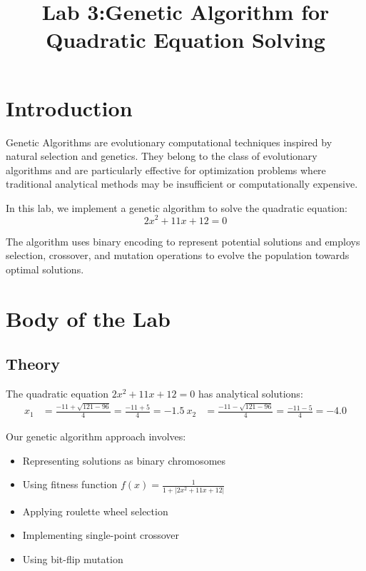 \documentclass[11pt,a4paper]{article}
\title{Lab 3:Genetic Algorithm for Quadratic Equation Solving}
\date{}
\begin{document}
\maketitle

\section{Introduction}

Genetic Algorithms are evolutionary computational techniques inspired by natural selection and genetics. They belong to the class of evolutionary algorithms and are particularly effective for optimization problems where traditional analytical methods may be insufficient or computationally expensive.

In this lab, we implement a genetic algorithm to solve the quadratic equation:
\begin{equation}
2x^2 + 11x + 12 = 0
\end{equation}

The algorithm uses binary encoding to represent potential solutions and employs selection, crossover, and mutation operations to evolve the population towards optimal solutions.

\section{Body of the Lab}

\subsection{Theory}

The quadratic equation $2x^2 + 11x + 12 = 0$ has analytical solutions:
\begin{align}
x_1 &= \frac{-11 + \sqrt{121 - 96}}{4} = \frac{-11 + 5}{4} = -1.5 \
x_2 &= \frac{-11 - \sqrt{121 - 96}}{4} = \frac{-11 - 5}{4} = -4.0
\end{align}

Our genetic algorithm approach involves:
\begin{itemize}
\item Representing solutions as binary chromosomes
\item Using fitness function $f(x) = \frac{1}{1 + |2x^2 + 11x + 12|}$
\item Applying roulette wheel selection
\item Implementing single-point crossover
\item Using bit-flip mutation
\end{itemize}
\end{document}
